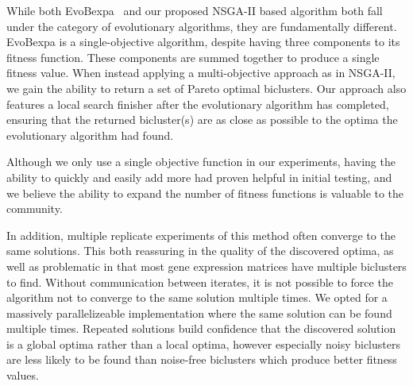
While both EvoBexpa~\cite{pontes2013configurable} and our proposed NSGA-II based algorithm both fall under the category of evolutionary algorithms, they are fundamentally different. EvoBexpa is a single-objective algorithm, despite having three components to its fitness function. These components are summed together to produce a single fitness value. When instead applying a multi-objective approach as in NSGA-II, we gain the ability to return a set of Pareto optimal biclusters. Our approach also features a local search finisher after the evolutionary algorithm has completed, ensuring that the returned bicluster(s) are as close as possible to the optima the evolutionary algorithm had found.

Although we only use a single objective function in our experiments, having the ability to quickly and easily add more had proven helpful in initial testing, and we believe the ability to expand the number of fitness functions is valuable to the community.

In addition, multiple replicate experiments of this method often converge to the same solutions.
This both reassuring in the quality of the discovered optima, as well as problematic in that most gene expression matrices have multiple biclusters to find.
Without communication between iterates, it is not possible to force the algorithm not to converge to the same solution multiple times.
We opted for a massively parallelizeable implementation where the same solution can be found multiple times.
Repeated solutions build confidence that the discovered solution is a global optima rather than a local optima, however especially noisy biclusters are less likely to be found than noise-free biclusters which produce better fitness values.

